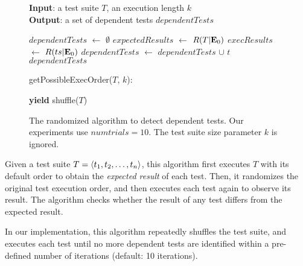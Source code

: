 \begin{figure}[t]
\textbf{Input}: a test suite $\mathit{T}$, an execution length $\mathit{k}$\\
\textbf{Output}: a set of dependent tests $\mathit{dependentTests}$\\
\vspace{-5mm}
\begin{algorithmic}[1]
\STATE $\mathit{dependentTests}$ $\leftarrow$ $\emptyset$
\STATE $\mathit{expectedResults}$ $\leftarrow$ $R(T|\mathbf{E}_0)$
\STATE $\mathit{execResults}$ $\leftarrow$ $R(ts|\mathbf{E}_0)$
\STATE $\mathit{dependentTests}$ $\leftarrow$ $\mathit{dependentTests}$ $\cup$ $\mathit{t}$
\ENDIF
\ENDFOR
\ENDFOR
\RETURN $\mathit{dependentTests}$
\end{algorithmic}


\medskip

getPossibleExecOrder($T$, $k$):\\
\vspace{-5mm}
\begin{algorithmic}[1]
\STATE \textbf{yield} shuffle($T$)
\ENDFOR
\end{algorithmic}

\vspace{-3mm}
\caption {The randomized algorithm to detect dependent tests.
Our experiments use $\mathit{numtrials}=10$.  The test suite size parameter
$k$ is ignored.}
\label{fig:basealgorithm}
\label{fig:randalgorithm}
\end{figure}


Given a test suite $T =  \langle t_1, t_2, \ldots, t_n \rangle $, this algorithm
first executes $T$ with its default order
to obtain the \emph{expected result} of each test.
Then, it randomizes the original
test execution order, and then executes each test
again to observe its result. The algorithm checks
whether the result of any test differs from the
expected result. 

In our implementation, this algorithm repeatedly
shuffles the test suite, and executes each test until
no more dependent tests are identified within a
pre-defined number of iterations (default: 10 iterations).

